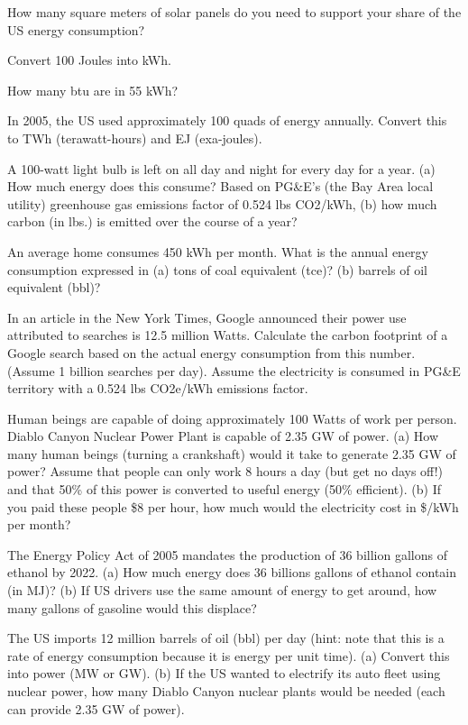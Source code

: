 \documentclass[12pt, oneside]{article}
\begin{document}
\problem{}
How many square meters of solar panels do you need to support your share
of the US energy consumption?


\problem{}
Convert 100 Joules into kWh.

\problem{}
How many btu are in 55 kWh?

\problem{}
In 2005, the US used approximately 100 quads of energy annually.
Convert this to TWh (terawatt-hours) and EJ (exa-joules).

\problem{}
A 100-watt light bulb is left on all day and night for every day for
a year. (a) How much energy does this consume? Based on PG\&E’s (the Bay
Area local utility) greenhouse gas emissions factor of 0.524 lbs
CO2/kWh, (b) how much carbon (in lbs.) is emitted over the course of a
year?

\problem{}
An average home consumes 450 kWh per month. What is the annual
energy consumption expressed in (a) tons of coal equivalent (tce)? (b)
barrels of oil equivalent (bbl)?

\problem{}
In an article in the New York Times, Google announced their power
use attributed to searches is 12.5 million Watts. Calculate the carbon
footprint of a Google search based on the actual energy consumption from
this number. (Assume 1 billion searches per day). Assume the electricity
is consumed in PG\&E territory with a 0.524 lbs CO2e/kWh emissions
factor.

\problem{}
Human beings are capable of doing approximately 100 Watts of work
per person. Diablo Canyon Nuclear Power Plant is capable of 2.35 GW of
power. (a) How many human beings (turning a crankshaft) would it take to
generate 2.35 GW of power? Assume that people can only work 8 hours a
day (but get no days off!) and that 50\% of this power is converted to
useful energy (50\% efficient). (b) If you paid these people \$8 per hour,
how much would the electricity cost in \$/kWh per month?

\problem{}
The Energy Policy Act of 2005 mandates the production of 36 billion
gallons of ethanol by 2022. (a) How much energy does 36 billions gallons
of ethanol contain (in MJ)? (b) If US drivers use the same amount of
energy to get around, how many gallons of gasoline would this displace?

\problem{}
The US imports 12 million barrels of oil (bbl) per day (hint: note
that this is a rate of energy consumption because it is energy per unit
time). (a) Convert this into power (MW or GW). (b) If the US wanted to
electrify its auto fleet using nuclear power, how many Diablo Canyon
nuclear plants would be needed (each can provide 2.35 GW of power).
\end{document}
